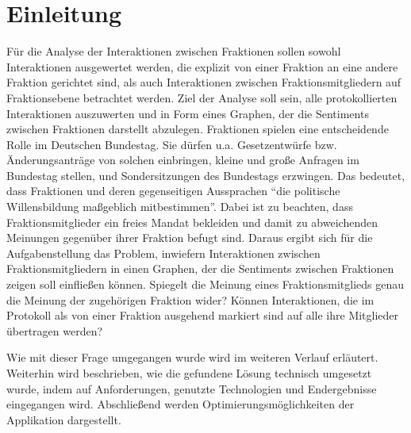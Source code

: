 \section{Einleitung}\label{sec:06_01_einleitung}
Für die Analyse der Interaktionen zwischen Fraktionen sollen sowohl Interaktionen ausgewertet werden, die explizit von einer Fraktion an eine andere Fraktion gerichtet sind, als auch Interaktionen zwischen Fraktionsmitgliedern auf Fraktionsebene betrachtet werden. Ziel der Analyse soll sein, alle protokollierten Interaktionen auszuwerten und in Form eines Graphen, der die Sentiments zwischen Fraktionen darstellt abzulegen.
Fraktionen spielen eine entscheidende Rolle im Deutschen Bundestag. Sie dürfen u.a. Gesetzentwürfe bzw. Änderungsanträge von solchen einbringen, kleine und große Anfragen im Bundestag stellen, und Sondersitzungen des Bundestags erzwingen. Das bedeutet, dass Fraktionen und deren gegenseitigen Aussprachen ``die politische Willensbildung maßgeblich mitbestimmen''.
Dabei ist zu beachten, dass Fraktionsmitglieder ein freies Mandat bekleiden und damit zu abweichenden Meinungen gegenüber ihrer Fraktion befugt sind. Daraus ergibt sich für die Aufgabenstellung das Problem, inwiefern Interaktionen zwischen Fraktionsmitgliedern in einen Graphen, der die Sentiments zwischen Fraktionen zeigen soll einfließen können. Spiegelt die Meinung eines Fraktionsmitglieds genau die Meinung der zugehörigen Fraktion wider? Können Interaktionen, die im Protokoll als von einer Fraktion ausgehend markiert sind auf alle ihre Mitglieder übertragen werden?

Wie mit dieser Frage umgegangen wurde wird im weiteren Verlauf erläutert. Weiterhin wird beschrieben, wie die gefundene Lösung technisch umgesetzt wurde, indem auf Anforderungen, genutzte Technologien und Endergebnisse eingegangen wird. Abschließend werden Optimierungsmöglichkeiten der Applikation dargestellt.